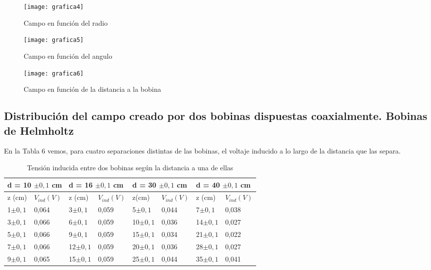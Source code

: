\documentclass[a4paper,12pt,spanish]{article}
\begin{document}
\begin{figure}[H]
	\centering
	\texttt{[image: grafica4]}
	\caption{Campo en función del radio}
	\label{fig:grafica4}
\end{figure}
\begin{figure}[H]
	\centering
	\texttt{[image: grafica5]}
	\caption{Campo en función del angulo}
	\label{fig:grafica5}
\end{figure}
\begin{figure}[H]
	\centering
	\texttt{[image: grafica6]}
	\caption{Campo en función de la distancia a la bobina}
	\label{fig:grafica6}
\end{figure}


\subsection{Distribución del campo creado por dos bobinas dispuestas coaxialmente. Bobinas de Helmholtz}

En la Tabla 6 vemos, para cuatro separaciones distintas de las bobinas, el voltaje inducido a lo largo de la distancia que las separa.



\begin{table}[H]
	\centering
	\begin{tabular}{|ll||ll||ll||ll|}
		\hline
		\multicolumn{2}{|l|}{d = 10 $\pm 0,1$ cm}      & \multicolumn{2}{l|}{d = 16 $\pm 0,1$ cm}      & \multicolumn{2}{l|}{d = 30 $\pm 0,1$ cm}      & \multicolumn{2}{l|}{d = 40 $\pm 0,1$ cm}      \\ \hline
		\multicolumn{1}{|l|}{z   (cm)} & $V_{ind} (\si{V})$  & \multicolumn{1}{l|}{z  (cm)} &$V_{ind} (\si{V})$  & \multicolumn{1}{l|}{z(cm)} & $V_{ind} (\si{V})$  & \multicolumn{1}{l|}{z (cm)} & $V_{ind} (\si{V})$ \\ \hline
		\multicolumn{1}{|l|}{1$\pm 0,1$}      & 0,064 & \multicolumn{1}{l|}{3$\pm 0,1$}      & 0,059 & \multicolumn{1}{l|}{5$\pm 0,1$}      & 0,044 & \multicolumn{1}{l|}{7$\pm 0,1$}      & 0,038 \\
		\multicolumn{1}{|l|}{3$\pm 0,1$}      & 0,066 & \multicolumn{1}{l|}{6$\pm 0,1$}      & 0,059 & \multicolumn{1}{l|}{10$\pm 0,1$}     & 0,036 & \multicolumn{1}{l|}{14$\pm 0,1$}     & 0,027 \\
		\multicolumn{1}{|l|}{5$\pm 0,1$}      & 0,066 & \multicolumn{1}{l|}{9$\pm 0,1$}      & 0,059 & \multicolumn{1}{l|}{15$\pm 0,1$}     & 0,034 & \multicolumn{1}{l|}{21$\pm 0,1$}     & 0,022 \\
		\multicolumn{1}{|l|}{7$\pm 0,1$}      & 0,066 & \multicolumn{1}{l|}{12$\pm 0,1$}     & 0,059 & \multicolumn{1}{l|}{20$\pm 0,1$}     & 0,036 & \multicolumn{1}{l|}{28$\pm 0,1$}     & 0,027 \\
		\multicolumn{1}{|l|}{9$\pm 0,1$}      & 0,065 & \multicolumn{1}{l|}{15$\pm 0,1$}     & 0,059 & \multicolumn{1}{l|}{25$\pm 0,1$}     & 0,044 & \multicolumn{1}{l|}{35$\pm 0,1$}     & 0,041 \\ \hline
	\end{tabular}
	\caption{Tensión inducida entre dos bobinas según la distancia a una de ellas}
\end{table}
\end{document}
